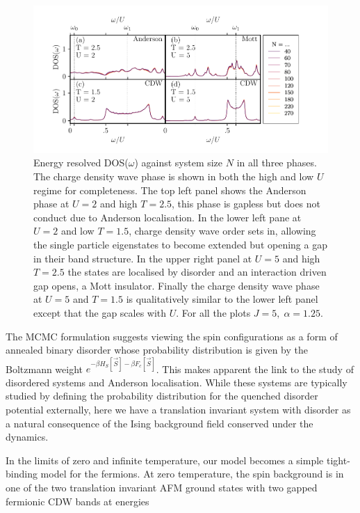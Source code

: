 \hypertarget{fig:DOS}{%
\begin{figure}
\centering
\includegraphics[width=1\textwidth,height=\textheight]{figure_code/fk_chapter/DOS/DOS}
\caption[{Energy resolved DOS(\(\omega\)) in the difference phases.}]{Energy resolved DOS(\(\omega\)) against system size \(N\) in all three phases. The charge density wave phase is shown in both the high and low \(U\) regime for completeness. The top left panel shows the Anderson phase at \(U = 2\) and high \(T = 2.5\), this phase is gapless but does not conduct due to Anderson localisation. In the lower left pane at \(U = 2\) and low \(T = 1.5\), charge density wave order sets in, allowing the single particle eigenstates to become extended but opening a gap in their band structure. In the upper right panel at \(U = 5\) and high \(T = 2.5\) the states are localised by disorder and an interaction driven gap opens, a Mott insulator. Finally the charge density wave phase at \(U = 5\) and \(T = 1.5\) is qualitatively similar to the lower left panel except that the gap scales with \(U\). For all the plots \(J = 5,\;\alpha = 1.25\).}
\label{fig:DOS}
\end{figure}
}

The MCMC formulation suggests viewing the spin configurations as a form of annealed binary disorder whose probability distribution is given by the Boltzmann weight \(e^{-\beta H_S[\vec{S}] - \beta F_c[\vec{S}]}\). This makes apparent the link to the study of disordered systems and Anderson localisation. While these systems are typically studied by defining the probability distribution for the quenched disorder potential externally, here we have a translation invariant system with disorder as a natural consequence of the Ising background field conserved under the dynamics.

In the limits of zero and infinite temperature, our model becomes a simple tight-binding model for the fermions. At zero temperature, the spin background is in one of the two translation invariant AFM ground states with two gapped fermionic CDW bands at energies

